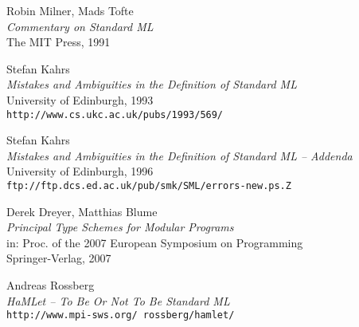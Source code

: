 \documentclass{article}
\newcommand{\void}[1]{}
\begin{document}
\begin{appendix}
\begin{thebibliography}{MTHM97}
Robin Milner, Mads Tofte \\
{\it Commentary on Standard ML} \\
The MIT Press, 1991

Stefan Kahrs \\
{\it Mistakes and Ambiguities in the Definition of Standard ML} \\
University of Edinburgh, 1993 \\
{\small\tt{http://www.cs.ukc.ac.uk/pubs/1993/569/}}

Stefan Kahrs \\
{\it Mistakes and Ambiguities in the Definition of Standard ML -- Addenda} \\
University of Edinburgh, 1996 \\
{\small\tt{ftp://ftp.dcs.ed.ac.uk/pub/smk/SML/errors-new.ps.Z}}

Derek Dreyer, Matthias Blume \\
{\it Principal Type Schemes for Modular Programs} \\
in: Proc. of the 2007 European Symposium on Programming \\
Springer-Verlag, 2007

Andreas Rossberg \\
{\it HaMLet -- To Be Or Not To Be Standard ML} \\
{\small\tt{http://www.mpi-sws.org/~rossberg/hamlet/}}

\void{
\bibitem[DHCK06]{typeclasses}
Derek Dreyer, Robert Harper, Manuel Chakravarty, Gabriele Keller \\
{\it Modular Type Classes} \\
Draft, 2006 \\
{\small\tt{http://www.cs.cmu.edu/~rwh/papers/mtc/apr06.pdf}}
}

\end{thebibliography}


\end{appendix}

\end{document}
